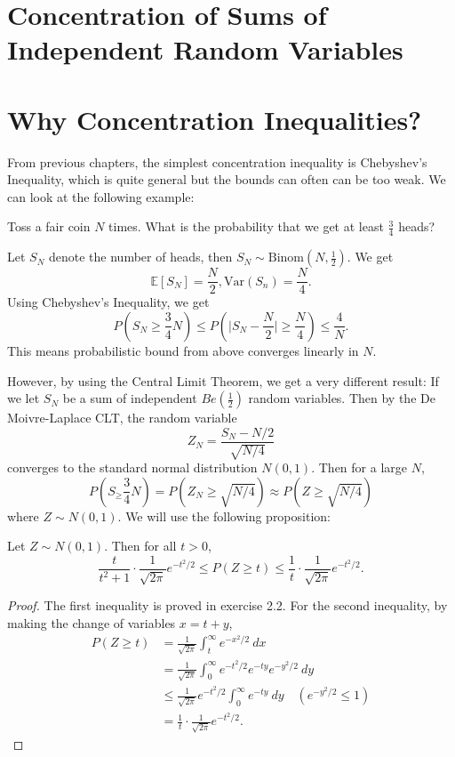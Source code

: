 \section{Concentration of Sums of Independent Random Variables}

\section*{Why Concentration Inequalities?}
From previous chapters, the simplest concentration inequality is Chebyshev's Inequality, which is quite 
general but the bounds can often can be too weak. We can look at the following example: 
\begin{example}
Toss a fair coin $N$ times. What is the probability that we get at least $\frac{3}{4}$ heads?

Let $S_N$ denote the number of heads, then $S_N \sim \text{Binom}(N, \frac{1}{2})$. We get 
\[ \mathbb{E}[S_N] = \frac{N}{2}, \mathrm{Var}(S_n) = \frac{N}{4}. \]
Using Chebyshev's Inequality, we get 
\[ P(S_N \geq \frac{3}{4}N) \leq P(\bigg| S_N - \frac{N}{2} \bigg| \geq \frac{N}{4}) \leq \frac{4}{N}. \]
This means probabilistic bound from above converges linearly in $N$. 

However, by using the Central Limit Theorem, we get a very different result: If we let $S_N$ be a sum of 
independent $Be(\frac{1}{2})$ random variables. Then by the De Moivre-Laplace CLT, the random variable 
\[ Z_N = \frac{S_N - N/2}{\sqrt{N/4}} \]
converges to the standard normal distribution $N(0, 1)$. Then for a large $N$, 
\[ P(S_ \geq \frac{3}{4}N) = P(Z_N \geq \sqrt{N/4}) \approx P(Z \geq \sqrt{N/4}) \]
where $Z \sim N(0, 1)$. We will use the following proposition: 

\begin{proposition}
Let $Z \sim N(0, 1)$. Then for all $t > 0$, 
\[  \frac{t}{t^2 + 1} \cdot \frac{1}{\sqrt{2 \pi}}e^{-t^2 / 2} \leq P(Z \geq t) 
\leq \frac{1}{t} \cdot \frac{1}{\sqrt{2 \pi}}e^{-t^2 / 2}. \]
\end{proposition}

\begin{proof}
The first inequality is proved in exercise 2.2. For the second inequality, by making the change 
of variables $x = t + y$,
\begin{align*}
	P(Z \geq t) 
	&= \frac{1}{\sqrt{2 \pi}} \int_{t}^{\infty} e^{-x^2 / 2} \ dx \\
	&= \frac{1}{\sqrt{2 \pi}} \int_{0}^{\infty} e^{-t^2 / 2} e^{-ty} e^{-y^2 / 2} \ dy \\
	&\leq \frac{1}{\sqrt{2 \pi}} e^{-t^2 / 2} \int_{0}^{\infty} e^{-ty} \ dy 
	\quad (e^{-y^2 / 2} \leq 1) \\
	&= \frac{1}{t} \cdot \frac{1}{\sqrt{2 \pi}}e^{-t^2 / 2}.
\end{align*}
\end{proof}


\end{example}
